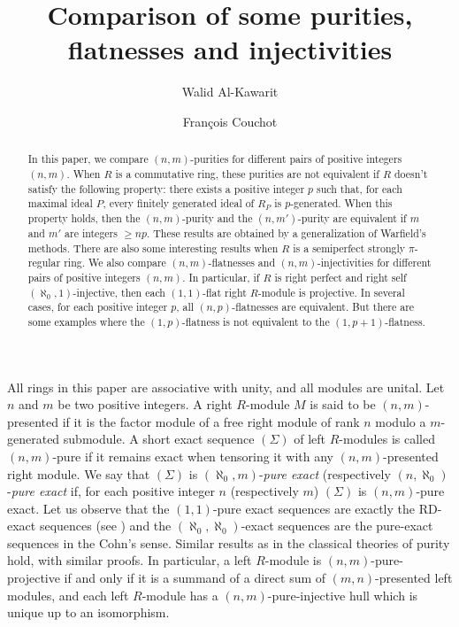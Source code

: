 \documentclass{amsart}
\begin{document}
\title[Comparison of some purities]{Comparison of some purities, flatnesses and injectivities}
\author{Walid Al-Kawarit}
\address{Universit\'e de Caen Basse-Normandie, CNRS UMR
  6139 LMNO,
F-14032 Caen, France}

\author{Fran\c cois Couchot}
\address{Universit\'e de Caen Basse-Normandie, CNRS UMR
  6139 LMNO,
F-14032 Caen, France}






\begin{abstract} In this paper, we  compare $(n,m)$-purities for different pairs of positive integers $(n,m)$. When $R$ is a commutative ring, these purities are not equivalent if $R$ doesn't satisfy the following property: there exists a positive integer $p$ such that, for each maximal ideal $P$, every finitely generated ideal of $R_P$ is $p$-generated.  When this property holds, then the $(n,m)$-purity and the $(n,m')$-purity are equivalent if $m$ and $m'$ are integers $\geq np$. These results are obtained by a generalization of Warfield's methods. There are also some interesting results when $R$ is a semiperfect strongly $\pi$-regular ring. We also compare $(n,m)$-flatnesses and $(n,m)$-injectivities for different pairs of positive integers $(n,m)$. In particular, if $R$ is right perfect and right self $(\aleph_0,1)$-injective, then each $(1,1)$-flat right $R$-module is projective. In several cases, for each positive integer $p$, all $(n,p)$-flatnesses are equivalent. But there are some examples where the $(1,p)$-flatness is not equivalent to the $(1,p+1)$-flatness.
\end{abstract}
\maketitle

All rings in this paper are associative with unity, and all modules are
unital. Let $n$ and $m$ be two positive integers. A right $R$-module $M$ is said to be $(n,m)$-presented if it is the factor module of a free right module of rank $n$ modulo a $m$-generated submodule. A short exact sequence $(\Sigma)$ of left $R$-modules is called $(n,m)$-pure if it remains exact when tensoring it with any $(n,m)$-presented right module.  We say that $(\Sigma)$ is $(\aleph_0,m)$-{\it pure exact} (respectively $(n,\aleph_0)$-{\it pure exact} if, for each positive integer $n$ (respectively $m$) $(\Sigma)$ is $(n,m)$-pure exact. Let us observe that the $(1,1)$-pure exact sequences are exactly the RD-exact sequences (see \cite{War69}) and the $(\aleph_0,\aleph_0)$-exact sequences are the pure-exact sequences in the Cohn's sense. Similar results as in the classical theories of purity hold, with similar proofs. In particular, a left $R$-module is $(n,m)$-pure-projective if and only if it is a summand of a direct sum of $(m,n)$-presented left modules, and each left $R$-module has a $(n,m)$-pure-injective hull which is unique up to an isomorphism. 
\end{document}
